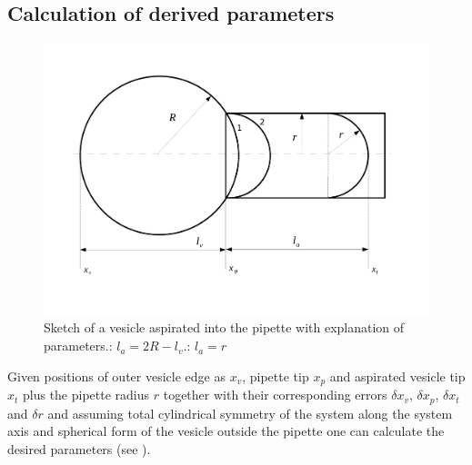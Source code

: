 \subsection{Calculation of derived parameters}\label{results}

\begin{figure}%
\includegraphics[width=\columnwidth]{figs/pipettesketch.pdf}%
\caption{Sketch of a vesicle aspirated into the pipette with explanation of parameters.: $l_a = 2R-l_v$.: $l_a = r$}%
\label{fig:pipettesketch}%
\end{figure}

Given positions of outer vesicle edge as $x_v$, pipette tip $x_p$ and aspirated vesicle tip $x_t$ plus the pipette radius $r$ together with their corresponding errors $\delta x_v$, $\delta x_p$, $\delta x_t$ and $\delta r$ and assuming total cylindrical symmetry of the system along the system axis and spherical form of the vesicle outside the pipette one can calculate the desired parameters (see ).

